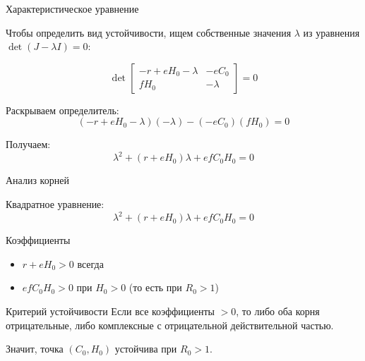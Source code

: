 \documentclass[12pt]{beamer}
\begin{document}
\begin{frame}{Характеристическое уравнение}

Чтобы определить вид устойчивости, ищем собственные значения $\lambda$ из уравнения $\det(J - \lambda I)=0$:

\[\det \begin{bmatrix} -r + eH_0 - \lambda & -eC_0 \\ fH_0 & -\lambda \end{bmatrix} = 0\]

Раскрываем определитель:
\[(-r + eH_0 - \lambda)(-\lambda) - (-eC_0)(fH_0) = 0\]

Получаем:
\[\lambda^2 + (r + eH_0)\lambda + e f C_0 H_0 = 0\]

\end{frame}

\begin{frame}{Анализ корней}

Квадратное уравнение:
\[\lambda^2 + (r + eH_0)\lambda + e f C_0 H_0 = 0\]

\begin{block}{Коэффициенты}
\begin{itemize}
\item $r + eH_0 > 0$ всегда
\item $e f C_0 H_0 > 0$ при $H_0 > 0$ (то есть при $R_0 > 1$)
\end{itemize}
\end{block}

\begin{exampleblock}{Критерий устойчивости}
Если все коэффициенты $> 0$, то либо оба корня отрицательные, либо комплексные с отрицательной действительной частью.
\end{exampleblock}

Значит, точка $(C_0, H_0)$ устойчива при $R_0 > 1$. 

\end{frame}
\end{document}
